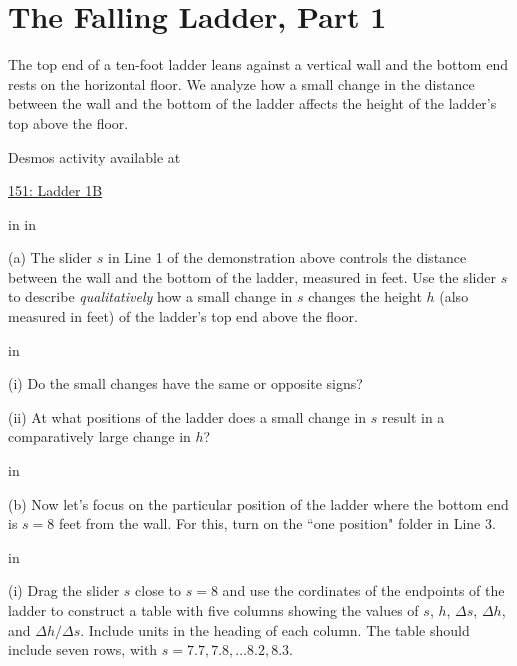 \documentclass{ximera}
\newcommand{\pskip}{\vskip 0.1 in}
\begin{document}
\section{The Falling Ladder, Part 1}


\begin{example}   \label{Ex435rsfeetr}

The top end of a ten-foot ladder leans against a vertical wall and the bottom end rests on the horizontal floor. We analyze how a small change in the distance between the wall and the bottom of the ladder affects the height of the ladder's top above the floor. 

 
\begin{onlineOnly}
    \begin{center}
\end{center}
\end{onlineOnly}

Desmos activity available at

\href{https://www.desmos.com/calculator/dvyuifyyg4}{151: Ladder 1B}

\pskip \pskip

\begin{question}  \label{Qdsfesarr4}

(a) The slider $s$ in Line 1 of the demonstration above controls the distance between the wall and the bottom of the ladder, measured in feet. Use the slider $s$ to describe \emph{qualitatively} how a small change in $s$ changes the height $h$ (also measured in feet) of the ladder's top end above the floor. 

\pskip

(i) Do the small changes have the same or opposite signs?

(ii) At what positions of the ladder does a small change in $s$ result in a comparatively large change in $h$?

\pskip

(b) Now let's focus on the particular position of the ladder where the bottom end is  $s=8$ feet from the wall. For this, turn on the ``one position" folder in Line 3.

\pskip

(i) Drag the slider $s$ close to $s=8$ and use the cordinates of the endpoints of the ladder to construct a table with five columns showing the values of $s$, $h$, $\Delta s$, $\Delta h$, and $\Delta h / \Delta s$. Include units in the heading of each column. The table should include seven rows, with $s=7.7, 7.8, \ldots 8.2, 8.3$.


\end{question}
\end{example}
\end{document}
